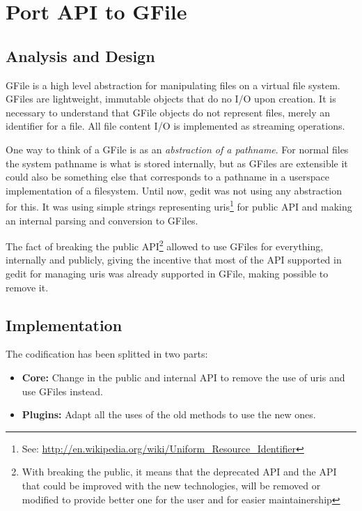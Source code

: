 
\chapter[Port API to GFile]{Port API to GFile}


\section{Analysis and Design}

GFile is a high level abstraction for manipulating files on a virtual file system. GFiles are lightweight, immutable objects that do no I/O upon creation. It is necessary to understand that GFile objects do not represent files, merely an identifier for a file. All file content I/O is implemented as streaming operations.

One way to think of a GFile is as an \emph{abstraction of a pathname}. For normal files the system pathname is what is stored internally, but as GFiles are extensible it could also be something else that corresponds to a pathname in a userspace implementation of a filesystem.\cite{website:gio} Until now, gedit was not using any abstraction for this. It was using simple strings representing uris\footnote{See: \url{http://en.wikipedia.org/wiki/Uniform_Resource_Identifier}} for public API and making an internal parsing and conversion to GFiles.

The fact of breaking the public API\footnote{With breaking the public, it means that the deprecated API and the API that could be improved with the new technologies, will be removed or modified to provide better one for the user and for easier maintainership} allowed to use GFiles for everything, internally and publicly, giving the incentive that most of the API supported in gedit for managing uris was already supported in GFile, making possible to remove it.

\newpage
\section{Implementation}

The codification has been splitted in two parts:
\begin{itemize}
  \item \textbf{Core:} Change in the public and internal API to remove the use of uris and use GFiles instead.
  \item \textbf{Plugins:} Adapt all the uses of the old methods to use the new ones.
\end{itemize}

